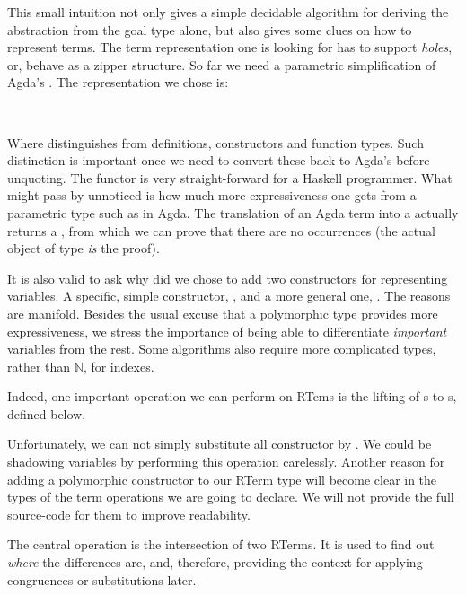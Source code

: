 This small intuition not only gives a simple decidable algorithm for deriving the abstraction from the goal type alone,
but also gives some clues on how to represent terms. The term representation one is looking for has to support \emph{holes}, or, behave as a zipper structure. So far we need a parametric simplification of Agda's . The representation
we chose is:

\\


Where  distinguishes from definitions, constructors and function types. Such
distinction is important once we need to convert these back to Agda's  before unquoting.
The  functor is very straight-forward for a Haskell programmer. What might pass by unnoticed
is how much more expressiveness one gets from a parametric type such as  in Agda.
The translation of an Agda term into a  actually returns a , from which
we can prove that there are no  occurrences (the actual object of type  \emph{is} the proof).

It is also valid to ask why did we chose to add two constructors for representing variables.
A specific, simple constructor, , and a more general one, . The reasons are
manifold. Besides the usual excuse that a polymorphic type provides more expressiveness, we
stress the importance of being able to differentiate \emph{important} variables from the rest.
Some algorithms also require more complicated types, rather than $\mathbb{N}$, for indexes.

Indeed, one important operation we can perform on RTems is the lifting of s to s,
defined below.


Unfortunately, we can not simply substitute all  constructor by . We could
be shadowing variables by performing this operation carelessly. Another reason for adding a polymorphic
constructor to our RTerm type will become clear in the types of the term operations we are going to declare.
We will not provide the full source-code for them to improve readability. 

The central operation is the intersection of two RTerms. It is used to find out \emph{where}
the differences are, and, therefore, providing the context for applying congruences or substitutions later. 

